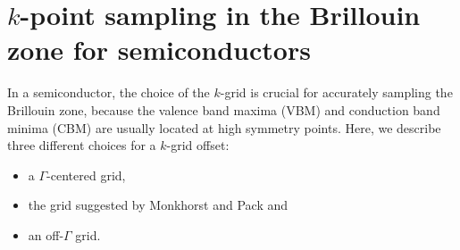 \newcommand{\Ang}{{\hspace{.2em}}\text{\AA}}


\section[k-point sampling in the Brillouin zone for semiconductors]{$k$-point sampling in the Brillouin zone for semiconductors}
\label{sec:k-point-sampling}

In a semiconductor, the choice of the $k$-grid is crucial for accurately sampling the Brillouin zone, because the valence band maxima (VBM) and conduction band minima (CBM) are usually located at high symmetry points. Here, we describe three different choices for a $k$-grid offset:
\begin{itemize}
 \item a $\Gamma$-centered grid,
 \item the grid suggested by Monkhorst and Pack \cite{Monkhorst76} and
 \item an off-$\Gamma$ grid.
\end{itemize}

